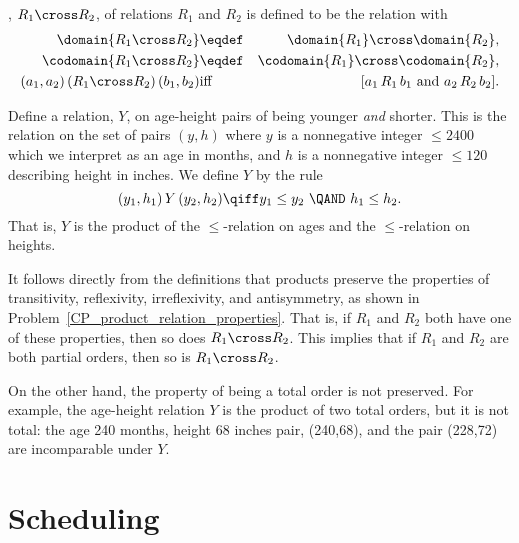 \begin{definition}\label{productrel}
, $R_1 \cross R_2$, of relations
$R_1$ and $R_2$ is defined to be the relation with
\begin{eqnarray*}
\domain{R_1 \cross R_2} &\eqdef& \domain{R_1} \cross \domain{R_2},\\
\codomain{R_1 \cross R_2} &\eqdef& \codomain{R_1} \cross \codomain{R_2},\\
(a_1,a_2)\, (R_1 \cross R_2)\, (b_1,b_2) &\text{iff}& [a_1\, R_1\, b_1
\text{ and } a_2\, R_2\, b_2].
\end{eqnarray*}

\end{definition}

\begin{example}\label{Y}
Define a relation, $Y$, on age-height pairs of being younger \emph{and}
shorter.  This is the relation on the set of pairs $(y,h)$ where $y$ is a
nonnegative integer $\le 2400$ which we interpret as an age in months, and $h$
is a nonnegative integer $\le 120$ describing height in inches.  We define $Y$
by the rule
\[
(y_1,h_1)\, Y\, (y_2,h_2) \qiff y_1 \le y_2\ \QAND\ h_1 \le h_2.
\]
That is, $Y$ is the product of the $\le$-relation on ages and the
$\le$-relation on heights.
\end{example}

It follows directly from the definitions that products preserve the
properties of transitivity, reflexivity, irreflexivity, and
antisymmetry, as shown in
Problem~\ref{CP_product_relation_properties}.  That is, if $R_1$ and
$R_2$ both have one of these properties, then so does $R_1 \cross
R_2$.  This implies that if $R_1$ and $R_2$ are both partial orders,
then so is $R_1 \cross R_2$.

On the other hand, the property of being a total order is not preserved.
For example, the age-height relation $Y$ is the product of two total
orders, but it is not total: the age 240 months, height 68 inches pair,
(240,68), and the pair (228,72) are incomparable under $Y$.

\begin{problems}
\classproblems
{}
\end{problems}

\section{Scheduling}\label{sched_sec}

